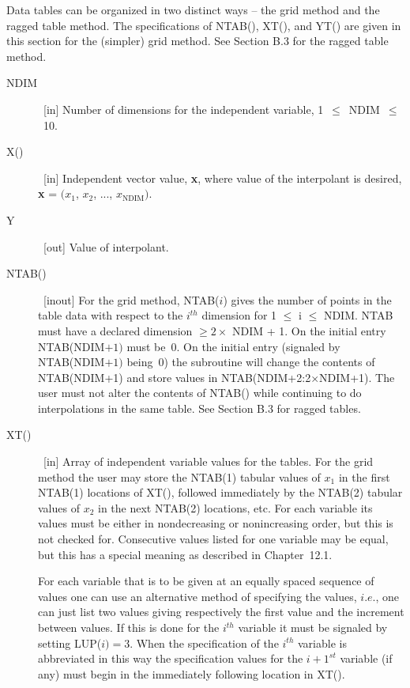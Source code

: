 \documentclass[twoside]{MATH77}
\begin{document}
Data tables can be organized in two distinct ways -- the grid method and
the ragged table method. The specifications of NTAB(), XT(), and YT()
are given in this section for the (simpler) grid method. See Section B.3
for the ragged table method.
\vspace{-5pt}
\begin{description}
\item[NDIM]  \ [in] Number of dimensions for the independent variable, 1~$%
\leq $~NDIM~$\leq $~10.
\item[X()]  \ [in] Independent vector value, {\bf x}, where value of
the interpolant is desired, {\bf x} = $(x_1$, $x_2$, ..., $x_{\text{NDIM}}).$
\item[Y]  \ [out] Value of interpolant.
\item[NTAB()]  \ [inout] For the grid method, NTAB($i$) gives the number of
points in the table data with respect to the $i^{th}$ dimension for 1 $\leq $
i $\leq $ NDIM. NTAB must have a declared dimension $\geq 2\times $ NDIM +
1. On the initial entry NTAB(NDIM$+1)$ must be~0. On the initial entry
(signaled by NTAB(NDIM$+1)$ being~0) the subroutine will change the contents
of NTAB(NDIM+1) and store values in NTAB(NDIM+2:2$\times $NDIM+1). The user
must not alter the contents of NTAB() while continuing to do interpolations
in the same table. See Section B.3 for ragged tables.
\item[XT()]  \ [in] Array of independent variable values for the tables. For
the grid method the user may store the NTAB(1) tabular values of $x_1$ in
the first NTAB(1) locations of XT(), followed immediately by the NTAB(2)
tabular values of $x_2$ in the next NTAB(2) locations, etc. For each
variable its values must be either in nondecreasing or nonincreasing
order, but this is not checked for.  Consecutive values listed for one
variable may be equal, but this has a special meaning as described in
Chapter~12.1.

For each variable that is to be given at an equally spaced sequence of
values one can use an alternative method of specifying the values, $i.e.$,
one can just list two values giving respectively the first value and the
increment between values. If this is done for the $i^{th}$ variable it must
be signaled by setting LUP($i)=3$. When the specification of the $i^{th}$
variable is abbreviated in this way the specification values for the $%
i+1^{st}$ variable (if any) must begin in the immediately following location
in XT().


\end{description}
\end{document}

